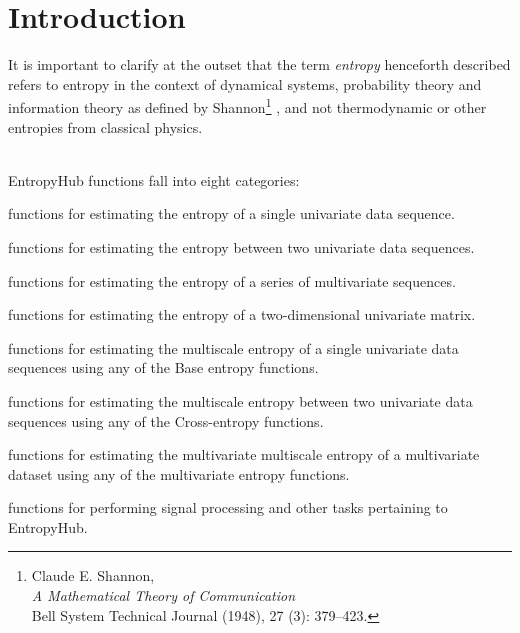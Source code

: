 \documentclass[12pt, a4paper, titlepage, openany]{book}
\newcommand\chapterimage[2][]{%
  \AddToShipoutPictureBG*{%
    \AtTextUpperLeft{%
     \hspace*{\textwidth}%
      \llap{%
            \texttt{[image: \#2]}}}}}%
\begin{document}
\vspace{10cm}
\renewcommand\contentsname{Table of Contents}
\renewcommand{\bibname}{Bibliographie}
\textbf{\tableofcontents}


\mainmatter

\chapter{\textbf{Introduction}}
\chapterimage[width=16cm, height=3cm]{Chapter Banner2.png}

\vspace{35mm}
\begin{tcolorbox}[sharp corners, colback=ehone!20, colframe=ehone, title=\textbf{IMPORTANT NOTE}]
It is important to clarify at the outset that the term \emph{entropy} henceforth described refers to entropy in the context of dynamical systems, probability theory and information theory as defined by Shannon\footnote{Claude E.  Shannon,\\ \indent\indent \emph{A Mathematical Theory of Communication}
\\\indent\indent Bell System Technical Journal (1948), 27 (3): 379–423.}
, and not thermodynamic or other entropies from classical physics.
\end{tcolorbox}
\ \\ EntropyHub functions fall into eight categories:\\
\begin{description}[labelsep=5mm, labelwidth=7cm, nosep,style=multiline,leftmargin=60mm]
\item[Base] functions for estimating the entropy of a single univariate data sequence.
\item[Cross-] functions for estimating the entropy between two univariate data sequences.
\item[Multivariate] functions for estimating the entropy of a series of multivariate sequences.
\item[Bidimensional] functions for estimating the entropy of a two-dimensional univariate matrix.
\item[Multiscale] functions for estimating the multiscale entropy of a single univariate data sequences using any of the Base entropy functions.
\item [Multiscale Cross-] functions for estimating the multiscale entropy between two univariate data sequences using any of the Cross-entropy functions.
\item [Multivariate Multiscale] functions for estimating the multivariate multiscale entropy of a multivariate dataset using any of the multivariate entropy functions.
\item [Other] functions for performing signal processing and other tasks pertaining to EntropyHub.
\end{description}
\end{document}
